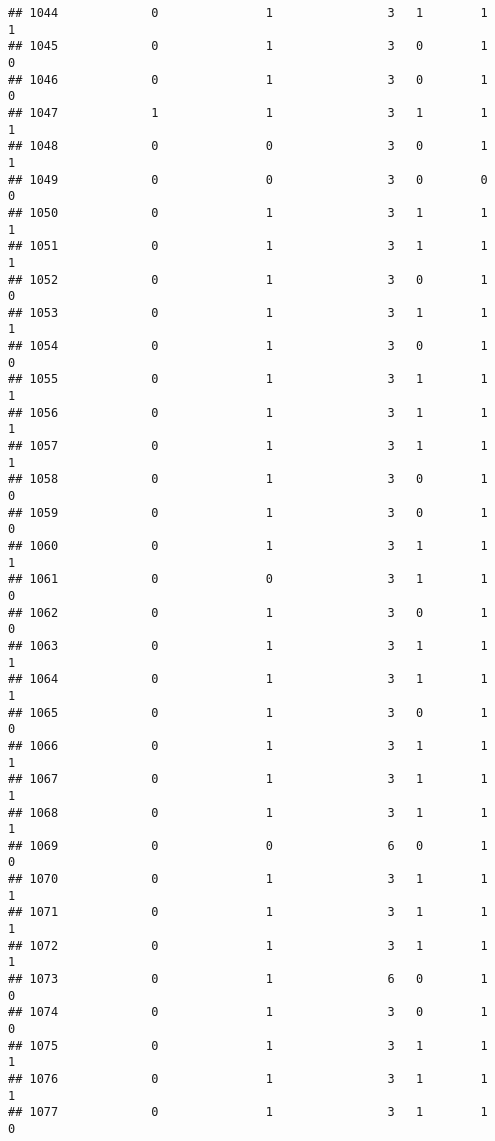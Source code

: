 \documentclass[]{article}
\begin{document}
\begin{verbatim}
## 1044             0               1                3   1        1        1
## 1045             0               1                3   0        1        0
## 1046             0               1                3   0        1        0
## 1047             1               1                3   1        1        1
## 1048             0               0                3   0        1        1
## 1049             0               0                3   0        0        0
## 1050             0               1                3   1        1        1
## 1051             0               1                3   1        1        1
## 1052             0               1                3   0        1        0
## 1053             0               1                3   1        1        1
## 1054             0               1                3   0        1        0
## 1055             0               1                3   1        1        1
## 1056             0               1                3   1        1        1
## 1057             0               1                3   1        1        1
## 1058             0               1                3   0        1        0
## 1059             0               1                3   0        1        0
## 1060             0               1                3   1        1        1
## 1061             0               0                3   1        1        0
## 1062             0               1                3   0        1        0
## 1063             0               1                3   1        1        1
## 1064             0               1                3   1        1        1
## 1065             0               1                3   0        1        0
## 1066             0               1                3   1        1        1
## 1067             0               1                3   1        1        1
## 1068             0               1                3   1        1        1
## 1069             0               0                6   0        1        0
## 1070             0               1                3   1        1        1
## 1071             0               1                3   1        1        1
## 1072             0               1                3   1        1        1
## 1073             0               1                6   0        1        0
## 1074             0               1                3   0        1        0
## 1075             0               1                3   1        1        1
## 1076             0               1                3   1        1        1
## 1077             0               1                3   1        1        0

\end{verbatim}
\end{document}
